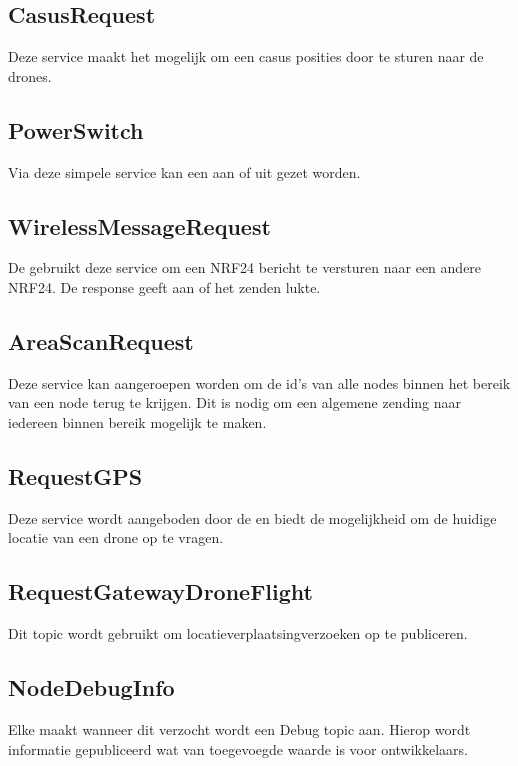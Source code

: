\documentclass[a4paper, 11pt, oneside]{report}
\begin{document}
\subsection{CasusRequest}
\label{architectural:ros:service:CasusRequest}
Deze service maakt het mogelijk om een casus posities door te sturen naar de drones.

\subsection{PowerSwitch}
\label{architectural:ros:service:PowerSwitch}
Via deze simpele service kan een  aan of uit gezet worden.

\subsection{WirelessMessageRequest}
\label{architectural:ros:service:WirelessMessageRequest}
De  gebruikt deze service om een NRF24 bericht te versturen naar een andere NRF24. De response geeft aan of het zenden lukte.

\subsection{AreaScanRequest}
\label{architectural:ros:service:AreaScanRequest}
Deze service kan aangeroepen worden om de id's van alle nodes binnen het bereik van een node terug te krijgen. 
Dit is nodig om een algemene zending naar iedereen binnen bereik mogelijk te maken.

\subsection{RequestGPS}
\label{architectural:ros:service:RequestGPS}
Deze service wordt aangeboden door de  en biedt de mogelijkheid om de huidige locatie van een drone op te vragen. 

\subsection{RequestGatewayDroneFlight}
\label{architectural:ros:topic:RequestGatewayDroneFlight}
Dit topic wordt gebruikt om locatieverplaatsingverzoeken op te publiceren. 

\subsection{NodeDebugInfo}
\label{architectural:ros:topic:NodeDebugInfo}
Elke  maakt wanneer dit verzocht wordt een Debug topic aan. Hierop wordt informatie gepubliceerd wat van toegevoegde waarde is voor ontwikkelaars.
\end{document}
